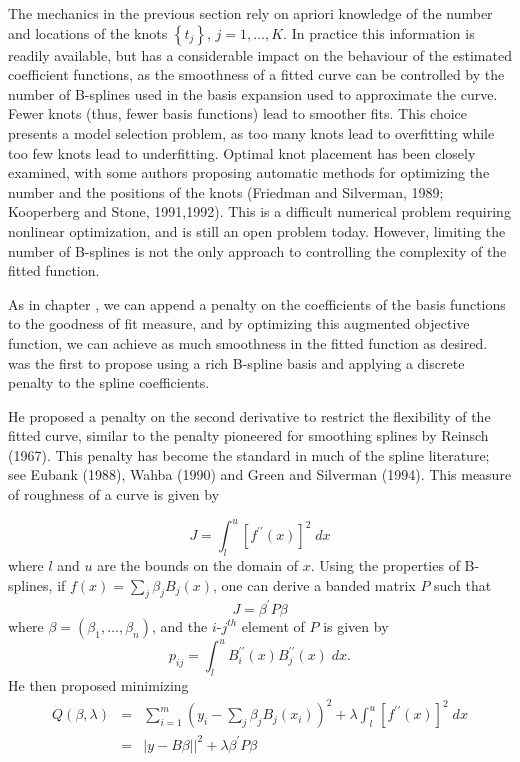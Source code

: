 \documentclass[12pt]{article}
\newcommand*\needsparaphrased{\color{red}}
\begin{document}
The mechanics in the previous section rely on apriori knowledge of the number and locations of the knots $\left\{t_j\right\}$, $j=1,\dots,K$. In practice this information is readily available, but has a considerable impact on the behaviour of the estimated coefficient functions, as the smoothness of a fitted curve can be controlled by the number of B-splines used in the basis expansion used to approximate the curve. Fewer knots (thus, fewer basis functions) lead to smoother fits. This choice presents a model selection problem, as too many knots lead to overfitting while too few knots lead to underfitting. Optimal knot placement has been closely examined, with some authors proposing automatic methods for optimizing the number and the positions of the knots (Friedman and Silverman, 1989; Kooperberg and Stone, 1991,1992). This is a difficult numerical problem requiring nonlinear optimization, and is still an open problem today. However, limiting the number of B-splines is not the only approach to controlling the complexity of the fitted function. 

As in chapter {\needsparaphrased{smoothing spline chapter}}, we can append a penalty on the coefficients of the basis functions to the goodness of fit measure, and by optimizing this augmented objective function, we can achieve as much smoothness in the fitted function as desired. \cite{o1986statistical} was the first to propose using a rich B-spline basis and applying a discrete penalty to the spline coefficients. 

 He proposed a penalty on the second derivative to restrict the flexibility of the fitted curve, similar to the penalty pioneered for smoothing splines by Reinsch (1967). This penalty has become the standard in much of the spline literature; see Eubank (1988), Wahba (1990) and Green and Silverman (1994). This measure of roughness of a curve is given by 
 
 \[
 J = \int_l^u \left[ f^{\prime \prime}\left(x\right)\right]^2\;dx
 \]
 \noindent
 where $l$ and $u$ are the bounds on the domain of $x$. Using the properties of B-splines, if $f\left(x\right) = \sum_{j} \beta_j B_j\left(x\right)$, one can derive a banded matrix $P$ such that 
 \[
 J = \beta^\prime P \beta
 \] 
 \noindent
 where $\beta = \left(\beta_1,\dots, \beta_n\right)$, and the $i$-$j^{th}$ element of $P$ is given by
 \[
 p_{ij} = \int_l^u B_i^{\prime \prime} \left( x \right)B_j^{\prime \prime} \left( x \right)\;dx.
 \]
 \noindent
 He then proposed minimizing
 \begin{eqnarray*}
 Q\left(\beta, \lambda \right) &=& \sum_{i=1}^m \left(y_i - \sum_{j} \beta_j B_j\left(x_i \right)\right)^2 + \lambda \int_l^u \left[ f^{\prime \prime}\left(x\right)\right]^2\;dx\\
 &=& \vert y - B\beta \vert  \vert^2 + \lambda\beta^\prime P \beta
 \end{eqnarray*}
\end{document}
